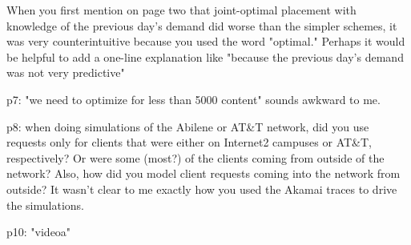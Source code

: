 When you first mention on page two that joint-optimal placement with knowledge of the previous day's demand did worse than the simpler schemes, it was very counterintuitive because you used the word "optimal."  Perhaps it would be helpful to add a one-line explanation like "because the previous day's demand was not very predictive"

p7: "we need to optimize for less than 5000 content" sounds awkward to me.

p8: when doing simulations of the Abilene or AT&T network, did you use requests only for clients that were either on Internet2 campuses or AT&T, respectively?  Or were some (most?) of the clients coming from outside of the network?  Also, how did you model client requests coming into the network from outside?  It wasn't clear to me exactly how you used the Akamai traces to drive the simulations.

p10: "videoa"
